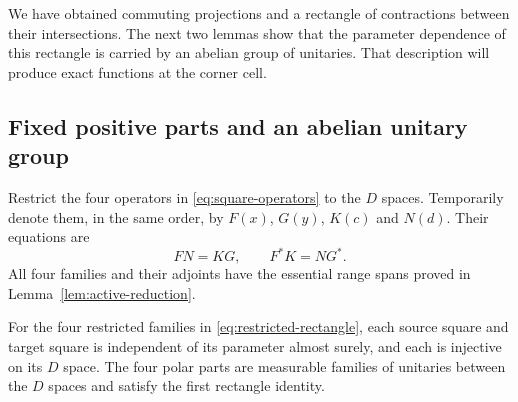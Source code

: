 We have obtained commuting projections and a rectangle of contractions
between their intersections.  The next two lemmas show that the parameter
dependence of this rectangle is carried by an abelian group of unitaries.
That description will produce exact functions at the corner cell.

\subsection{Fixed positive parts and an abelian unitary group}

Restrict the four operators in \eqref{eq:square-operators} to the $D$
spaces.  Temporarily denote them, in the same order, by $F(x)$, $G(y)$,
$K(c)$ and $N(d)$.  Their equations are
\begin{equation}\label{eq:restricted-rectangle}
 FN=KG,\qquad F^*K=NG^*.
\end{equation}
All four families and their adjoints have the essential range spans
proved in Lemma~\ref{lem:active-reduction}.

\begin{lemma}\label{lem:fixed-squares}
For the four restricted families in \eqref{eq:restricted-rectangle},
each source square and target square is independent of its parameter
almost surely, and each is injective on its $D$ space.  The four polar
parts are measurable families of unitaries between the $D$ spaces and
satisfy the first rectangle identity.
\end{lemma}

